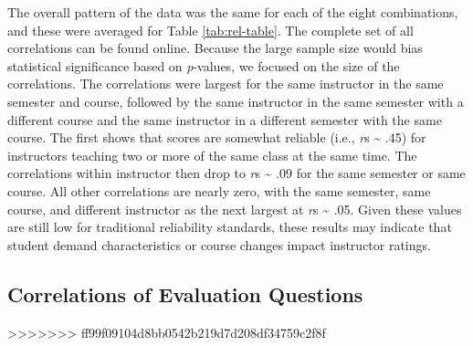 \documentclass[,man]{apa6}
\theoremstyle{definition}
\theoremstyle{definition}
\theoremstyle{definition}
\theoremstyle{remark}
\begin{document}
The overall pattern of the data was the same for each of the eight
combinations, and these were averaged for Table \ref{tab:rel-table}. The
complete set of all correlations can be found online. Because the large
sample size would bias statistical significance based on
\emph{p}-values, we focused on the size of the correlations. The
correlations were largest for the same instructor in the same semester
and course, followed by the same instructor in the same semester with a
different course and the same instructor in a different semester with
the same course. The first shows that scores are somewhat reliable
(i.e., \emph{r}s \textasciitilde{} .45) for instructors teaching two or
more of the same class at the same time. The correlations within
instructor then drop to \emph{r}s \textasciitilde{} .09 for the same
semester or same course. All other correlations are nearly zero, with
the same semester, same course, and different instructor as the next
largest at \emph{r}s \textasciitilde{} .05. Given these values are still
low for traditional reliability standards, these results may indicate
that student demand characteristics or course changes impact instructor
ratings.

\hypertarget{correlations-of-evaluation-questions}{%
\subsection{Correlations of Evaluation
Questions}\label{correlations-of-evaluation-questions}}
>>>>>>> ff99f09104d8bb0542b219d7d208df34759c2f8f
\end{document}
